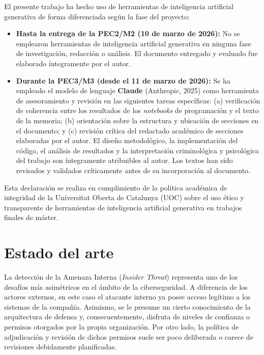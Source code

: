 \documentclass[IB]{TFUOC}%
\begin{document}
El presente trabajo ha hecho uso de herramientas de inteligencia artificial 
generativa de forma diferenciada según la fase del proyecto:

\begin{itemize}
    \item \textbf{Hasta la entrega de la PEC2/M2 (10 de marzo de 2026):} 
    No se emplearon herramientas de inteligencia artificial generativa en 
    ninguna fase de investigación, redacción o análisis. El documento 
    entregado y evaluado fue elaborado íntegramente por el autor.

    \item \textbf{Durante la PEC3/M3 (desde el 11 de marzo de 2026):} 
    Se ha empleado el modelo de lenguaje \textbf{Claude} (Anthropic, 2025) 
    como herramienta de asesoramiento y revisión en las siguientes tareas 
    específicas: (a) verificación de coherencia entre los resultados de los 
    \textit{notebooks} de programación y el texto de la memoria; (b) 
    orientación sobre la estructura y ubicación de secciones en el documento; 
    y (c) revisión crítica del redactado académico de secciones elaboradas 
    por el autor. El diseño metodológico, la implementación del código, el 
    análisis de resultados y la interpretación criminológica y psicológica 
    del trabajo son íntegramente atribuibles al autor. Los textos han sido 
    revisados y validados críticamente antes de su incorporación al documento.
\end{itemize}

\noindent Esta declaración se realiza en cumplimiento de la política académica de 
integridad de la Universitat Oberta de Catalunya (UOC) sobre el uso ético 
y transparente de herramientas de inteligencia artificial generativa en 
trabajos finales de máster.



\chapter{Estado del arte}

La detección de la Amenaza Interna (\textit{Insider Threat}) representa uno de los desafíos más asimétricos en el ámbito de la ciberseguridad. A diferencia de los actores externos, en este caso el atacante interno ya posee acceso legítimo a los sistemas de la compañía. Asimismo, se le presume un cierto conocimiento de la arquitectura de defensa y, consecuentemente, disfruta de niveles de confianza o permisos otorgados por la propia organización. Por otro lado, la política de adjudicación y revisión de dichos permisos suele ser poco deliberada o carece de revisiones debidamente planificadas. 
\end{document}
